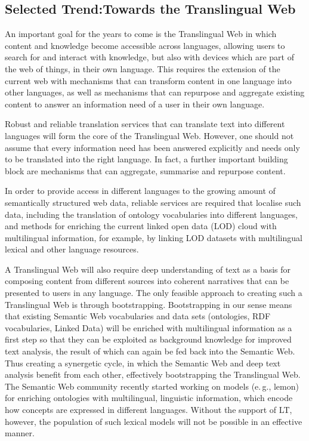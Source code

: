 \documentclass[10pt, plain]{../../metanetpaper}
\begin{document}
\begin{multicols}{2}
\subsection[Selected Trend: Towards a Translingual Web]{Selected Trend:\newline Towards the Translingual Web}
\label{sec:translingual-web}


An important goal for the years to come is the Translingual Web in which content and knowledge become accessible across languages, allowing users to search for and interact with knowledge, but also with devices which are part of the web of things, in their own language. This requires the extension of the current web with mechanisms that can transform content in one language into other languages, as well as mechanisms that can repurpose and aggregate existing content to answer an information need of a user in their own language. 

Robust and reliable translation services that can translate text into different languages will form the core of the Translingual Web. However, one should not assume that every information need has been answered explicitly and needs only to be translated into the right language. In fact, a further important building block are mechanisms that can aggregate, summarise and repurpose content.

In order to provide access in different languages to the growing amount of semantically structured web data,  reliable services are required that localise such data, including the translation of ontology vocabularies into different languages, and methods for enriching the current linked open data (LOD) cloud with multilingual information, for example, by linking LOD datasets with multilingual lexical and other language resources.

A Translingual Web will also require deep understanding of text as a basis for composing content from different sources into coherent narratives that can be presented to users in any language. The only feasible approach to creating such a Translingual Web is through bootstrapping. Bootstrapping in our sense means that existing Semantic Web vocabularies and data sets (ontologies, RDF vocabularies, Linked Data) will be enriched with multilingual information as a first step so that they can be exploited as background knowledge for improved text analysis, the result of which can again be fed back into the Semantic Web. Thus creating a synergetic cycle, in which the Semantic Web and deep text analysis benefit from each other, effectively bootstrapping the Translingual Web. The Semantic Web community recently started working on models (e.\,g., lemon) for enriching ontologies with multilingual, linguistic information, which encode how concepts are expressed in different languages. Without the support of LT, however, the population of such lexical models will not be possible in an effective manner.


\end{multicols}
\end{document}
